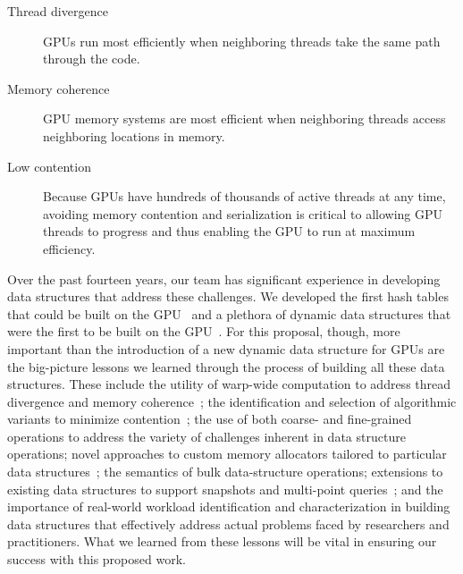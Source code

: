 \begin{description}
  \item[Thread divergence] GPUs run most efficiently when neighboring threads take the same path through the code.
  \item[Memory coherence] GPU memory systems are most efficient when neighboring threads access neighboring locations in memory.
  \item[Low contention] Because GPUs have hundreds of thousands of active threads at any time, avoiding memory contention and serialization is critical to allowing GPU threads to progress and thus enabling the GPU to run at maximum efficiency.
\end{description}


Over the past fourteen years, our team has significant experience in developing data structures that address these challenges. We developed the first hash tables that could be built on the GPU~\cite{Alcantara:2009:RPH,Alcantara:2011:BAE} and a plethora of dynamic data structures that were the first to be built on the GPU~\cite{Ashkiani:2018:ADH,Ashkiani:2018:GLA,Awad:2019:EAH,Geil:2018:QFA}. For this proposal, though, more important than the introduction of a new dynamic data structure for GPUs are the big-picture lessons we learned through the process of building all these data structures. These include the utility of warp-wide computation to address thread divergence and memory coherence~\cite{Ashkiani:2017:PAA}; the identification and selection of algorithmic variants to minimize contention~\cite{Awad:2019:EAH}; the use of both coarse- and fine-grained operations to address the variety of challenges inherent in data structure operations; novel approaches to custom memory allocators tailored to particular data structures~\cite{Ashkiani:2018:ADH}; the semantics of bulk data-structure operations; extensions to existing data structures to support snapshots and multi-point queries~\cite{Awad:2022:AGM}; and the importance of real-world workload identification and characterization in building data structures that effectively address actual problems faced by researchers and practitioners. What we learned from these lessons will be vital in ensuring our success with this proposed work.



